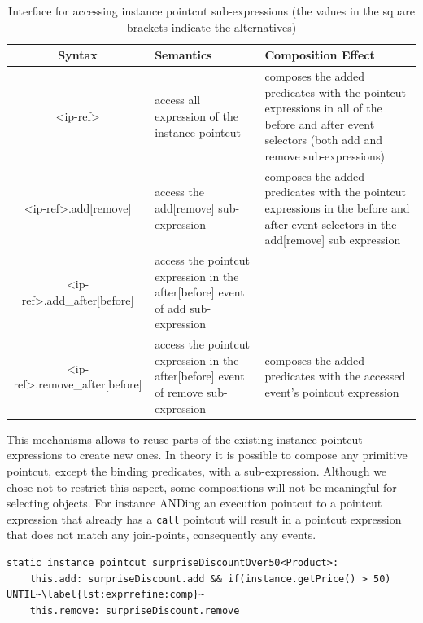 \documentclass{acm_proc_article-sp}
\newcommand{\lstinln}[1]{\lstinline~#1~}
\begin{document}
\begin{table}
	\centering
		\begin{tabularx}{\textwidth}{|c|X|X|}
		\hline
		Syntax & Semantics & Composition Effect \\
		\hline
		<ip-ref> & access all expression of the instance pointcut & composes the added predicates with the pointcut expressions in all of the before and after event selectors (both add and remove sub-expressions)\\
		\hline
		<ip-ref>.add[remove] & access the add[remove] sub-expression	& composes the added predicates with the pointcut expressions in the before and after event selectors in the add[remove] sub expression \\
		\hline
		<ip-ref>.add_after[before] & access the pointcut expression in the after[before] event of add sub-expression & \\ 
		\cline{1-2}
		<ip-ref>.remove_after[before] & access the pointcut expression in the after[before] event of remove sub-expression	& \multirow{2}{0.33\textwidth}{composes the added predicates with the accessed event's pointcut expression} \\
		\hline
		\end{tabularx}
	\caption{Interface for accessing instance pointcut sub-expressions (the values in the square brackets indicate the alternatives)}
	\label{tab:itcexpr}
\end{table}

This mechanisms allows to reuse parts of the existing instance pointcut expressions to create new ones. In theory it is possible to compose any primitive pointcut, except the binding predicates, with a sub-expression. Although we chose not to restrict this aspect, some compositions will not be meaningful for selecting objects. For instance ANDing an \textsf{execution} pointcut to a pointcut expression that already has a \lstinln{call} pointcut will result in a pointcut expression that does not match any join-points, consequently any events. 

\begin{lstlisting}[float=h!, caption={Refining the expressions \lstinln{surpriseDiscount}(Listing~\ref{lst:basic}) instance pointcut}, label={lst:exprrefine}]
static instance pointcut surpriseDiscountOver50<Product>: 
	this.add: surpriseDiscount.add && if(instance.getPrice() > 50) UNTIL~\label{lst:exprrefine:comp}~
	this.remove: surpriseDiscount.remove
\end{lstlisting}
\end{document}
